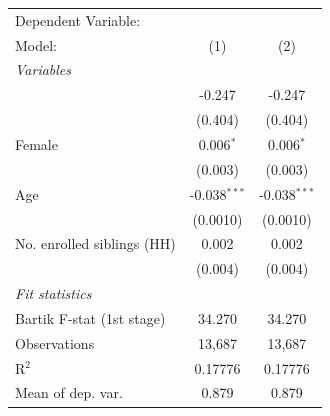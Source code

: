 \begin{tabular}{lcc}
   \tabularnewline \midrule \midrule
   Dependent Variable: & \\
   Model:                                                         & (1)            & (2)\\  
   \midrule
   \emph{Variables}\\
        & -0.247         & -0.247\\   
                                                                  & (0.404)        & (0.404)\\   
   Female                                                         & 0.006$^{*}$    & 0.006$^{*}$\\   
                                                                  & (0.003)        & (0.003)\\   
   Age                                                            & -0.038$^{***}$ & -0.038$^{***}$\\   
                                                                  & (0.0010)       & (0.0010)\\   
   No. enrolled siblings (HH)                                     & 0.002          & 0.002\\   
                                                                  & (0.004)        & (0.004)\\   
   \midrule
   \emph{Fit statistics}\\
   Bartik F-stat (1st stage)                                  & 34.270         & 34.270\\  
   Observations                                                   & 13,687         & 13,687\\  
   R$^2$                                                          & 0.17776        & 0.17776\\  
   Mean of dep. var.                                              & 0.879          & 0.879\\  
\bottomrule
\end{tabular}
